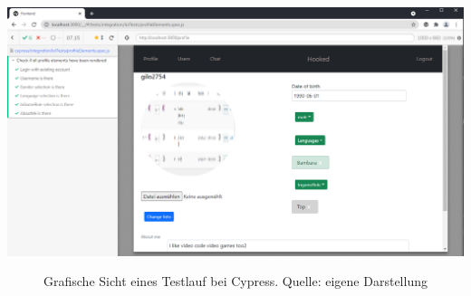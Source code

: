 \\
\includegraphics[width=\textwidth]{sources/Cy_Test_running.png}
\begin{figure}[h!]
	\centering
	\caption{Grafische Sicht eines Testlauf bei Cypress. 
	Quelle: eigene Darstellung}
	\label{fig:Cy_Test_running}
\end{figure} 


